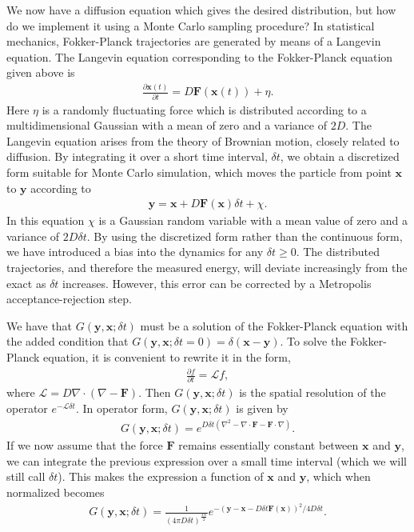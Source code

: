 \documentclass[twoside,english]{uiofysmaster}
\begin{document}
We now have a diffusion equation which gives the desired distribution,
but how do we implement it using a Monte Carlo sampling procedure? In statistical
mechanics, Fokker-Planck trajectories are generated by means of a
Langevin equation. The Langevin equation corresponding to the
Fokker-Planck equation given above is
\begin{align}
	\frac{\partial \bm{x} (t)}{\partial t} = D \bm{F} (\bm{x}(t)) + \eta.
\end{align}
Here $\eta$ is a randomly fluctuating force which is distributed
according to a multidimensional Gaussian with a mean of zero and a
variance of $2D$. The Langevin equation arises from the theory of
Brownian motion, closely related to diffusion. By integrating it over
a short time interval, $\delta t$, we obtain a discretized form
suitable for Monte Carlo simulation, which moves the particle from
point $\bm{x}$ to $\bm{y}$ according to
\begin{align}
	\bm{y} = \bm{x} + D \bm{F} (\bm{x}) \delta t + \chi.
\end{align}
In this equation $\chi$ is a Gaussian random variable with a mean
value of zero and a variance of $2D \delta t$. By using the
discretized form rather than the continuous form, we have introduced a
bias into the dynamics for any $\delta t \geq 0$. The distributed
trajectories, and therefore the measured energy, will deviate
increasingly from the exact as $\delta t$ increases. However, this
error can be corrected by a Metropolis acceptance-rejection step.

We have that $G(\bm{y}, \bm{x}; \delta t)$ must be a solution of the
Fokker-Planck equation with the added condition that $G(\bm{y},
\bm{x}; \delta t = 0) = \delta (\bm{x} - \bm{y})$. To solve the
Fokker-Planck equation, it is convenient to rewrite it in the form,
\begin{align}
	\frac{\partial f}{\partial t} = \mathcal{L} f,
\end{align}
where $\mathcal{L} = D \nabla \cdot (\nabla - \bm{F})$. Then
$G(\bm{y}, \bm{x}; \delta t)$ is the spatial resolution of the
operator $e^{-\mathcal{L} \delta t}$. In operator form, $G(\bm{y},
\bm{x}; \delta t)$ is given by
\begin{align}
	G(\bm{y}, \bm{x}; \delta t)  = e^{ D \delta t ( \nabla^2 - \nabla \cdot \bm{F} - \bm{F} \cdot \nabla ) }.
\end{align}
If we now assume that the force $\bm{F}$ remains essentially constant
between $\bm{x}$ and $\bm{y}$, we can integrate the previous
expression over a small time interval (which we will still call
$\delta t$). This makes the expression a function of $\bm{x}$ and
$\bm{y}$, which when normalized becomes
\begin{align}
	G(\bm{y}, \bm{x}; \delta t) = \frac{1}{(4 \pi D \delta t)^{\frac{3N}{2}}} e^{ - ( \bm{y} - \bm{x} - D\delta t \bm{F}(\bm{x}) )^2 / 4D \delta t }.
\end{align}
\end{document}

